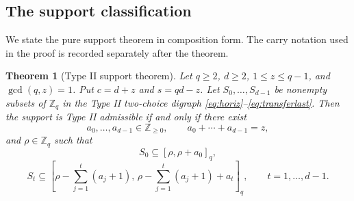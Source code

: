 \documentclass[11pt]{article}
\newtheorem{theorem}{Theorem}[section]
\theoremstyle{definition}
\theoremstyle{remark}
\begin{document}
\subsection{The support classification}

We state the pure support theorem in composition form. The carry notation used in the proof is recorded separately after the theorem.

\begin{theorem}[Type II support theorem]
\label{thm:support}
Let $q\ge2$, $d\ge2$, $1\le z\le q-1$, and $\gcd(q,z)=1$. Put $c=d+z$ and $s=qd-z$. Let $S_0,\ldots,S_{d-1}$ be nonempty subsets of $\mathbb Z_q$ in the Type II two-choice digraph \eqref{eq:horiz}--\eqref{eq:transferlast}. Then the support is Type II admissible if and only if there exist
\[
        a_0,\ldots,a_{d-1}\in\mathbb Z_{\ge0},
        \qquad a_0+\cdots+a_{d-1}=z,
\]
and $\rho\in\mathbb Z_q$ such that
\begin{equation}
        S_0\subseteq [\rho,\rho+a_0]_q,
        \label{eq:S0a}
\end{equation}
\begin{equation}
        S_t\subseteq
        \left[
        \rho-\sum_{j=1}^t(a_j+1),\,
        \rho-\sum_{j=1}^t(a_j+1)+a_t
        \right]_q,
        \qquad t=1,\ldots,d-1 .
        \label{eq:Sta}
\end{equation}
\end{theorem}
\end{document}
